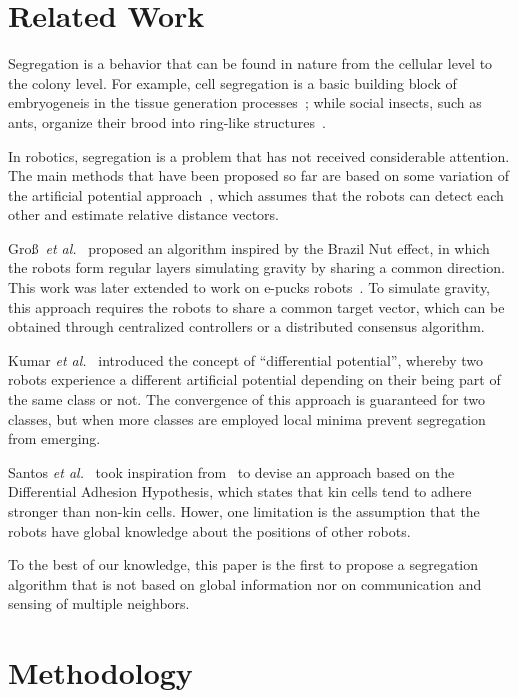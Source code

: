 \documentclass[letterpaper, 10 pt, conference]{ieeeconf}
\begin{document}
\section{Related Work}
Segregation is a behavior that can be found in nature from the cellular level to the
colony level. For example, cell segregation is a basic building block of embryogeneis
in the tissue generation processes~\cite{batlle_molecular_2012,Steinberg1963}; while
social insects, such as ants, organize their brood into ring-like
structures~\cite{Franks1992}.

In robotics, segregation is a problem that has not received considerable
attention. The main methods that have been proposed so far are based on some
variation of the artificial potential approach~\cite{Spears2004}, which assumes
that the robots can detect each other and estimate relative distance vectors.

Gro\ss~\emph{et al.}~\cite{gross_segregation_2009} proposed an
algorithm inspired by the Brazil Nut effect, in which the robots form regular
layers simulating gravity by sharing a common direction. This work was later
extended to work on e-pucks robots~\cite{Chen2012}. To simulate gravity, this
approach requires the robots to share a common target vector, which can be
obtained through centralized controllers or a distributed consensus algorithm.

Kumar \emph{et al.}~\cite{kumar_segregation_2010} introduced the concept of
``differential potential'', whereby two robots experience a different artificial
potential depending on their being part of the same class or not. The
convergence of this approach is guaranteed for two classes, but when more
classes are employed local minima prevent segregation from emerging.

Santos \emph{et al.}~\cite{santos_segregation_2014} took inspiration
from~\cite{kumar_segregation_2010} to devise an approach based on the
Differential Adhesion Hypothesis, which states that kin cells tend to adhere
stronger than non-kin cells. Hower, one limitation is the assumption
that the robots have global knowledge about the positions of other robots.

To the best of our knowledge, this paper is the first to propose a segregation
algorithm that is not based on global information nor on communication and
sensing of multiple neighbors.

\section{Methodology}
\end{document}
